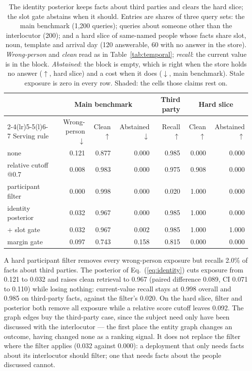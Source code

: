 \documentclass{article} %
\begin{document}
\begin{table}[t]
\centering
\small
\setlength{\tabcolsep}{4pt}
\begin{tabular}{@{}lrrrrrr@{}}
\toprule
 & \multicolumn{3}{c}{Main benchmark} & Third party & \multicolumn{2}{c}{Hard slice} \\
\cmidrule(lr){2-4}\cmidrule(lr){5-5}\cmidrule(l){6-7}
Serving rule & Wrong-person $\downarrow$ & Clean $\uparrow$ & Abstained $\downarrow$ & Recall $\uparrow$ & Clean $\uparrow$ & Abstained $\uparrow$ \\
\midrule
none & 0.121 & 0.877 & 0.000 & 0.985 & 0.000 & 0.000 \\
relative cutoff @0.7 & 0.008 & 0.983 & 0.000 & 0.975 & 0.908 & 0.000 \\
participant filter & 0.000 & 0.998 & 0.000 & 0.020 & 1.000 & 0.000 \\
identity posterior & 0.032 & 0.967 & 0.000 & \cellcolor{cPos!60}0.985 & \cellcolor{cPos!60}1.000 & 0.000 \\
\quad + slot gate & 0.032 & 0.967 & 0.002 & 0.985 & 1.000 & \cellcolor{cPos!60}1.000 \\
margin gate & 0.097 & 0.743 & 0.158 & 0.815 & 0.000 & 0.000 \\
\bottomrule
\end{tabular}
\caption{The identity posterior keeps facts about third parties and clears the hard slice; the slot gate abstains when it should. Entries are shares of three query sets: the main benchmark (1{,}200 queries); queries about someone other than the interlocutor (200); and a hard slice of same-named people whose facts share slot, noun, template and arrival day (120 answerable, 60 with no answer in the store). \emph{Wrong-person} and \emph{clean} read as in Table~\ref{tab:temporal}; \emph{recall}: the current value is in the block. \emph{Abstained}: the block is empty, which is right when the store holds no answer ($\uparrow$, hard slice) and a cost when it does ($\downarrow$, main benchmark). Stale exposure is zero in every row. Shaded: the cells those claims rest on.}
\label{tab:identity}
\end{table}

A hard participant filter removes every wrong-person exposure but recalls 2.0\% of facts about third parties. The posterior of Eq.~(\ref{eq:identity}) cuts exposure from 0.121 to 0.032 and raises clean retrieval to 0.967 (paired difference 0.089, CI 0.071 to 0.110) while losing nothing: current-value recall stays at 0.998 overall and 0.985 on third-party facts, against the filter's 0.020. On the hard slice, filter and posterior both remove all exposure while a relative score cutoff leaves 0.092. The graph edges buy the third-party case, since the subject need only have been discussed with the interlocutor --- the first place the entity graph changes an outcome, having changed none as a ranking signal. It does not replace the filter where the filter applies (0.032 against 0.000): a deployment that only needs facts about its interlocutor should filter; one that needs facts about the people discussed cannot.
\end{document}
